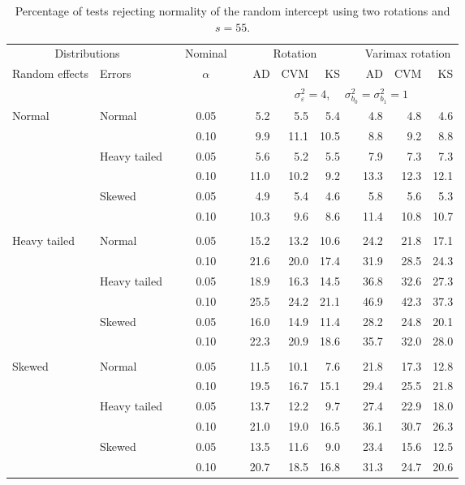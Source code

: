 \begin{table}[ht]
\centering
\caption{\label{tab:fixedsimb055} Percentage of tests rejecting normality of the random intercept using two rotations and $s = 55$.}
\begin{scriptsize}
\begin{tabular}{ll p{.1cm} c p{.1cm} rrr p{.1cm} rrr}
  \hline
  \multicolumn{2}{c}{Distributions}& & Nominal & &  \multicolumn{3}{c}{Rotation} & & \multicolumn{3}{c}{Varimax rotation} \\ \cline{1-2} \cline{6-8} \cline{10-12}   
  Random effects & Errors & & $\alpha$ & & AD & CVM & KS & & AD & CVM & KS \\ 
   \hline
& && && \multicolumn{7}{c}{$\sigma_{\varepsilon}^2 = 4$, \ \ $\sigma_{b_0}^2 = \sigma_{b_1}^2 = 1$} \\ \cline{6-12}
\rowcolor{gray!20} Normal & Normal &  & 0.05 &  & 5.2 & 5.5 & 5.4 &  & 4.8 & 4.8 & 4.6 \\ 
\rowcolor{gray!20}    &  &  & 0.10 &  & 9.9 & 11.1 & 10.5 &  & 8.8 & 9.2 & 8.8 \\ 
\rowcolor{gray!20}    & Heavy tailed &  & 0.05 &  & 5.6 & 5.2 & 5.5 &  & 7.9 & 7.3 & 7.3 \\ 
\rowcolor{gray!20}    &  &  & 0.10 &  & 11.0 & 10.2 & 9.2 &  & 13.3 & 12.3 & 12.1 \\ 
\rowcolor{gray!20}    & Skewed &  & 0.05 &  & 4.9 & 5.4 & 4.6 &  & 5.8 & 5.6 & 5.3 \\ 
\rowcolor{gray!20}    &  &  & 0.10 &  & 10.3 & 9.6 & 8.6 &  & 11.4 & 10.8 & 10.7 \\ 
&&&&&&&&&&&\\
  Heavy tailed & Normal &  & 0.05 &  & 15.2 & 13.2 & 10.6 &  & 24.2 & 21.8 & 17.1 \\ 
   &  &  & 0.10 &  & 21.6 & 20.0 & 17.4 &  & 31.9 & 28.5 & 24.3 \\ 
   & Heavy tailed &  & 0.05 &  & 18.9 & 16.3 & 14.5 &  & 36.8 & 32.6 & 27.3 \\ 
   &  &  & 0.10 &  & 25.5 & 24.2 & 21.1 &  & 46.9 & 42.3 & 37.3 \\ 
   & Skewed &  & 0.05 &  & 16.0 & 14.9 & 11.4 &  & 28.2 & 24.8 & 20.1 \\ 
   &  &  & 0.10 &  & 22.3 & 20.9 & 18.6 &  & 35.7 & 32.0 & 28.0 \\ 
&&&&&&&&&&&\\
  Skewed & Normal &  & 0.05 &  & 11.5 & 10.1 & 7.6 &  & 21.8 & 17.3 & 12.8 \\ 
   &  &  & 0.10 &  & 19.5 & 16.7 & 15.1 &  & 29.4 & 25.5 & 21.8 \\ 
   & Heavy tailed &  & 0.05 &  & 13.7 & 12.2 & 9.7 &  & 27.4 & 22.9 & 18.0 \\ 
   &  &  & 0.10 &  & 21.0 & 19.0 & 16.5 &  & 36.1 & 30.7 & 26.3 \\ 
   & Skewed &  & 0.05 &  & 13.5 & 11.6 & 9.0 &  & 23.4 & 15.6 & 12.5 \\ 
   &  &  & 0.10 &  & 20.7 & 18.5 & 16.8 &  & 31.3 & 24.7 & 20.6 \\ 


\end{tabular}
\end{scriptsize}
\end{table}
